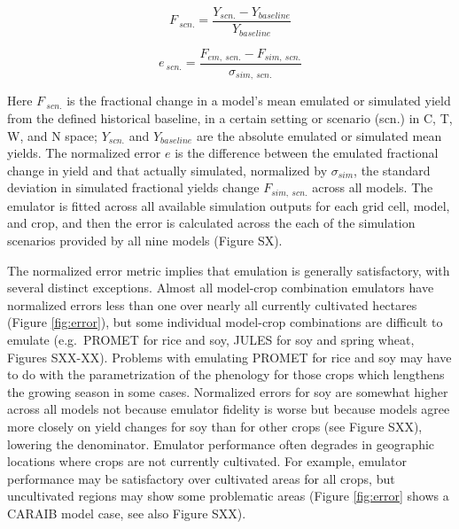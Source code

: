 \documentclass[gmd, manuscript]{copernicus} %
\begin{document}
\begin{equation}
    \label{eqn:per_yield}
    F_{\: scn.}=\frac{Y_{scn.}-Y_{baseline}}{Y_{baseline}}
\end{equation}

\begin{equation}
    \label{eqn:error}
    e_{\: scn.} =\frac{F_{em, \: scn.}-F_{sim, \: scn.}}{\sigma_{sim, \: scn.}}
\end{equation}

Here $F_{\: scn.}$ is the fractional change in a model's mean emulated or simulated yield from the defined historical baseline, in a certain setting or scenario (scn.) in C, T, W, and N space; $Y_{scn.}$ and $Y_{baseline}$ are the absolute emulated or simulated mean yields. 
The normalized error $e$ is the difference between the emulated fractional change in yield and that actually simulated, normalized by $\sigma_{sim}$, the standard deviation in simulated fractional yields change $F_{sim,\: scn.}$ across all models. 
The emulator is fitted across all available simulation outputs for each grid cell, model, and crop, and then the error is calculated across the each of the simulation scenarios provided by all nine models (Figure SX). 

The normalized error metric implies that emulation is generally satisfactory, with several distinct exceptions. 
Almost all model-crop combination emulators have normalized errors less than one over nearly all currently cultivated hectares (Figure \ref{fig:error}), but some individual model-crop combinations are difficult to emulate (e.g.\ PROMET for rice and soy, JULES for soy and spring wheat, Figures SXX-XX). 
Problems with emulating PROMET for rice and soy may have to do with the parametrization of the phenology for those crops which lengthens the growing season in some cases. 
Normalized errors for soy are somewhat higher across all models not because emulator fidelity is worse but because models agree more closely on yield changes for soy than for other crops (see Figure SXX), lowering the denominator. 
Emulator performance often degrades in geographic locations where crops are not currently cultivated. 
For example, emulator performance may be satisfactory over cultivated areas for all crops, but uncultivated regions may show some problematic areas (Figure \ref{fig:error} shows a CARAIB model case, see also Figure SXX).
\end{document}
